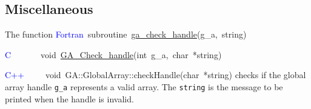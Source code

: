 \subsection{Miscellaneous }

The function
\textcolor{blue}{Fortran}~subroutine~\href{http://www.emsl.pnl.gov/docs/global/ga_ops.html\#ga_check_handle}{ga\_{}check\_{}handle}(g\_a,~string)~

\textcolor{blue}{C~~}~~~~~void~\href{http://www.emsl.pnl.gov/docs/global/c_nga_ops.html\#ga_check_handle}{GA\_{}Check\_{}handle}(int~g\_a,~char~{*}string)

\textcolor{blue}{C++}~~~~~void~GA::GlobalArray::checkHandle(char~{*}string)
checks if the global array handle \texttt{g\_a} represents a valid
array. The \texttt{string} is the message to be printed when the handle
is invalid.
